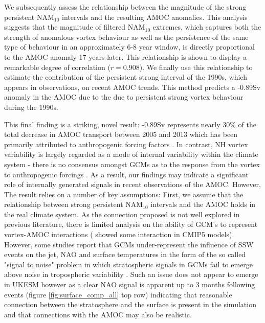 We subsequently assess the relationship between the magnitude of the strong persistent NAM$_{10}$ intervals and the resulting AMOC anomalies. This analysis suggests that the magnitude of filtered NAM$_{10}$ extremes, which captures both the strength of anomalous vortex behaviour as well as the persistence of the same type of behaviour in an approximately 6-8 year window, is directly proportional to the AMOC anomaly 17 years later. This relationship is shown to display a remarkable degree of correlation ($r = 0.908$). We finally use this relationship to estimate the contribution of the persistent strong interval of the 1990s, which appears in observations, on recent AMOC trends. This method predicts a -0.89Sv anomaly in the AMOC due to the due to persistent strong vortex behaviour during the 1990s.

This final finding is a striking, novel result: -0.89Sv represents nearly 30\% of the total decrease in AMOC transport between 2005 and 2013 which has been primarily attributed to anthropogenic forcing factors \citep{caesarObserved2018, caesarCurrent2021}. In contrast, NH vortex variability is largely regarded as a mode of internal variability within the climate system - there is no consensus amongst GCMs as to the response from the vortex to anthropogenic forcings \citep{ayarzaguenaUncertainty2020}. As a result, our findings may indicate a significant role of internally generated signals in recent observations of the AMOC. However, The result relies on a number of key assumptions: First, we assume that the relationship between strong persistent NAM$_{10}$ intervals and the AMOC holds in the real climate system. As the connection proposed is not well explored in previous literature, there is limited analysis on the ability of GCM's to represent vortex-AMOC interactions (\cite{reichlerStratospheric2012} showed some interaction in CMIP5 models). However, some studies report that GCMs under-represent the influence of SSW events on the jet, NAO and surface temperatures in the form of the so called "signal to noise" problem in which stratospheric signals in GCMs fail to emerge above noise in tropospheric variability \citep{scaifeSignaltonoise2018}. Such an issue does not appear to emerge in UKESM however as a clear NAO signal is apparent up to 3 months following events (figure \ref{fig:surface_comp_all} top row) indicating that reasonable connection between the stratosphere and the surface is present in the simulation and that connections with the AMOC may also be realistic. 


